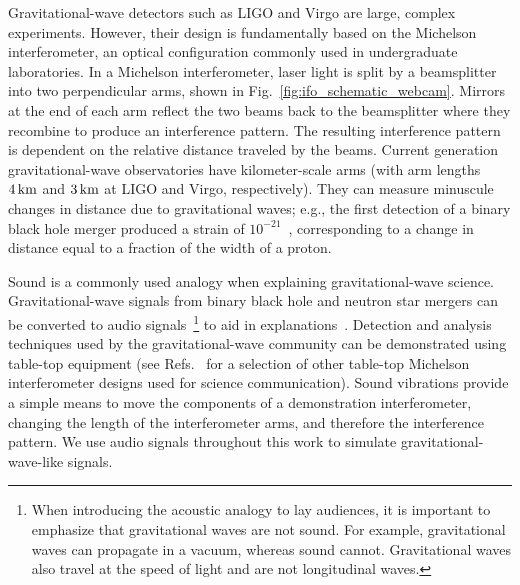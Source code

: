 \documentclass[paper-main.tex]{subfiles}
\begin{document}
Gravitational-wave detectors such as LIGO and Virgo are large, complex experiments. 
However, their design is fundamentally based on the Michelson interferometer, an optical configuration commonly used in undergraduate laboratories. 
In a Michelson interferometer, laser light is split by a beamsplitter into two perpendicular arms, shown in Fig.~\ref{fig:ifo_schematic_webcam}. 
Mirrors at the end of each arm reflect the two beams back to the beamsplitter where they recombine to produce an interference pattern.
The resulting interference pattern is dependent on the relative distance traveled by the beams. 
Current generation gravitational-wave observatories have kilometer-scale arms (with arm lengths $4\,{\rm km}$ and $3\,{\rm km}$ at LIGO and Virgo, respectively). 
They can measure minuscule changes in distance due to gravitational waves; e.g., the first detection of a binary black hole merger produced a strain of $10^{-21}$~\cite{GW150914}, corresponding to a change in distance equal to a fraction of the width of a proton. 



Sound is a commonly used analogy when explaining gravitational-wave science. 
Gravitational-wave signals from binary black hole and neutron star mergers can be converted to audio signals~\footnote{When introducing the acoustic analogy to lay audiences, it is important to emphasize that gravitational waves are not sound. For example, gravitational waves can propagate in a vacuum, whereas sound cannot. Gravitational waves also travel at the speed of light and are not longitudinal waves.} to aid in explanations~\cite{SoundsOfSpaceTime:online,BlackHoleHunter:online}.
Detection and analysis techniques used by the gravitational-wave community can be demonstrated using table-top equipment (see Refs.~\cite{TTExhibit:2020,TTExhibit:online,AMIGO:online,ThorLabsIFO,LIGOIFOGlue,LIGOIFOMagnets,FoxEtAl:1999} for a selection of other table-top Michelson interferometer designs used for science communication).
Sound vibrations provide a simple means to move the components of a demonstration interferometer, changing the length of the interferometer arms, and therefore the interference pattern.
We use audio signals throughout this work to simulate gravitational-wave-like signals.
\end{document}
